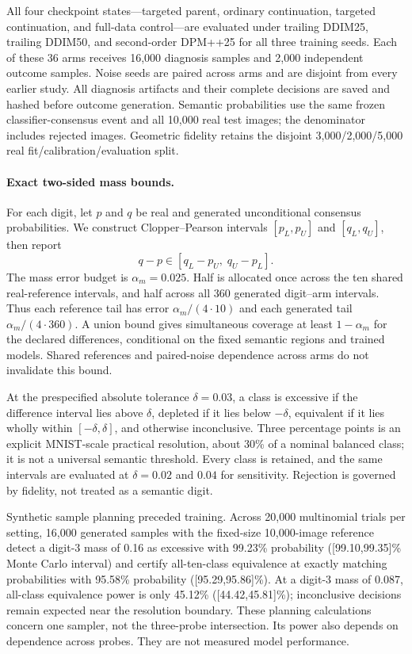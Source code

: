 All four checkpoint states---targeted parent, ordinary continuation, targeted
continuation, and full-data control---are evaluated under trailing DDIM25,
trailing DDIM50, and second-order DPM++25 for all three training seeds.
Each of these 36 arms receives 16,000 diagnosis samples and 2,000 independent
outcome samples. Noise seeds are paired across arms and are disjoint from
every earlier study. All diagnosis artifacts and their complete decisions
are saved and hashed before outcome generation. Semantic probabilities use
the same frozen classifier-consensus event and all 10,000 real test images;
the denominator includes rejected images. Geometric fidelity retains the
disjoint 3,000/2,000/5,000 real fit/calibration/evaluation split.

\paragraph{Exact two-sided mass bounds.}
For each digit, let $p$ and $q$ be real and generated unconditional consensus
probabilities. We construct Clopper--Pearson intervals $[p_L,p_U]$ and
$[q_L,q_U]$, then report
\begin{equation}
  q-p\in[q_L-p_U,\;q_U-p_L].
\label{eq:supp_mnist_mass_difference}
\end{equation}
The mass error budget is $\alpha_m=0.025$. Half is allocated once across
the ten shared real-reference intervals, and half across all 360 generated
digit--arm intervals. Thus each reference tail has error
$\alpha_m/(4\cdot10)$ and each generated tail
$\alpha_m/(4\cdot360)$. A union bound gives simultaneous coverage at least
$1-\alpha_m$ for the declared differences, conditional on the fixed
semantic regions and trained models. Shared references and paired-noise
dependence across arms do not invalidate this bound.

At the prespecified absolute tolerance $\delta=0.03$, a class is excessive if
the difference interval lies above $\delta$, depleted if it lies below $-\delta$,
equivalent if it lies wholly within $[-\delta,\delta]$, and otherwise inconclusive.
Three percentage points is an explicit MNIST-scale practical resolution,
about 30\% of a nominal balanced class; it is not a universal semantic
threshold. Every class is retained, and the same intervals are evaluated
at $\delta=0.02$ and $0.04$ for sensitivity. Rejection is governed by fidelity,
not treated as a semantic digit.

Synthetic sample planning preceded training. Across 20,000 multinomial
trials per setting, 16,000 generated samples with the fixed-size 10,000-image
reference detect a digit-3 mass of 0.16 as excessive with 99.23\% probability
([99.10,99.35]\% Monte Carlo interval)
and certify all-ten-class equivalence at exactly matching probabilities
with 95.58\% probability ([95.29,95.86]\%). At a digit-3 mass of 0.087,
all-class equivalence power is only 45.12\% ([44.42,45.81]\%); inconclusive
decisions remain expected near the resolution boundary. These planning
calculations concern one sampler, not the three-probe intersection. Its
power also depends on dependence across probes. They are not measured model
performance.

